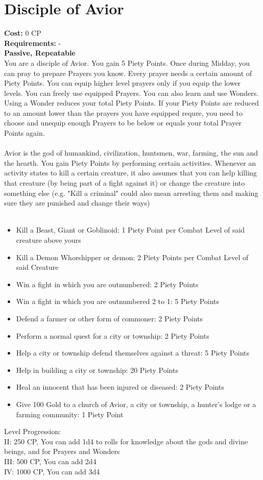 \section{Disciple of Avior}
\textbf{Cost:} 0 CP\\
\textbf{Requirements:} - \\
\textbf{Passive, Repeatable}\\
You are a disciple of Avior. You gain 5 Piety Points. Once during Midday, you can pray to prepare Prayers you know. Every prayer needs a certain amount of Piety Points. You can equip higher level prayers only if you equip the lower levels. You can freely use equipped Prayers. You can also learn and use Wonders. Using a Wonder reduces your total Piety Points. If your Piety Points are reduced to an amount lower than the prayers you have equipped requre, you need to choose and unequip enough Prayers to be below or equals your total Prayer Points again.\\
\\
Avior is the god of humankind, civilization, huntsmen, war, farming, the sun and the hearth. You gain Piety Points by performing certain activities. Whenever an activity states to kill a certain creature, it also assumes that you can help killing that creature (by being part of a fight against it) or change the creature into something else (e.g. "Kill a criminal" could also mean arresting them and making sure they are punished and change their ways)\\
\\
\begin{itemize}
	\item Kill a Beast, Giant or Goblinoid: 1 Piety Point per Combat Level of said creature above yours
	\item Kill a Demon Whorshipper or demon: 2 Piety Points per Combat Level of said Creature
	\item Win a fight in which you are outnumbered: 2 Piety Points
	\item Win a fight in which you are outnumbered 2 to 1: 5 Piety Points
	\item Defend a farmer or other form of commoner: 2 Piety Points
	\item Perform a normal quest for a city or township: 2 Piety Points
	\item Help a city or township defend themselves against a threat: 5 Piety Points
	\item Help in building a city or township: 20 Piety Points
	\item Heal an innocent that has been injured or diseased: 2 Piety Points
	\item Give 100 Gold to a church of Avior, a city or township, a hunter's lodge or a farming community: 1 Piety Point
\end{itemize}

Level Progression:\\
II: 250 CP, You can add 1d4 to rolls for knowledge about the gods and divine beings, and for Prayers and Wonders\\
III: 500 CP, You can add 2d4\\
IV: 1000 CP, You can add 3d4\\